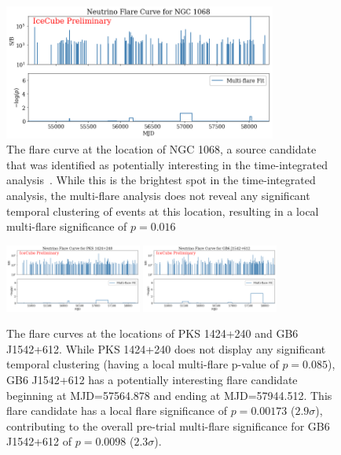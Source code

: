 \begin{figure}[h]
\centering
\includegraphics[width=0.8\textwidth]{figs/fcurve_NGC1068.png}
\caption{The flare curve at the location of NGC 1068, a source candidate that was identified as potentially interesting in the time-integrated analysis~\cite{10yr_tint}. While this is the brightest spot in the time-integrated analysis, the multi-flare analysis does not reveal any significant temporal clustering of events at this location, resulting in a local multi-flare significance of $p=0.016$}
\label{fig:ngc1068}
\end{figure}

\begin{figure}[h]
\centering
\includegraphics[width=0.4\textwidth]{figs/fcurve_PKS1424+240.png}
\includegraphics[width=0.4\textwidth]{figs/fcurve_GB6.png}
\caption{The flare curves at the locations of PKS 1424+240 and GB6 J1542+612. While PKS 1424+240 does not display any significant temporal clustering (having a local multi-flare p-value of $p=0.085$), GB6 J1542+612 has a potentially interesting flare candidate beginning at MJD=57564.878 and ending at MJD=57944.512. This flare candidate has a local flare significance of $p=0.00173$ ($2.9 \sigma$), contributing to the overall pre-trial multi-flare significance for GB6 J1542+612 of $p=0.0098$ ($2.3 \sigma$). }
\label{fig:othertints}
\end{figure}



